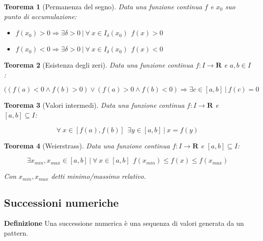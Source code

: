 \documentclass{article}
\newtheorem{theorem}{Teorema}
\begin{document}
\begin{theorem}[Permanenza del segno]
    Data una funzione continua $f$ e $x_0$ suo punto di accumulazione:
    \begin{itemize}
        \item $f(x_0)>0\Rightarrow \exists\delta>0\ |\ \forall\ x\in I_\delta(x_0)\ \ f(x)>0$
        \item $f(x_0)<0\Rightarrow \exists\delta>0\ |\ \forall\ x\in I_\delta(x_0)\ \ f(x)<0$\newline
    \end{itemize}
\end{theorem}

\begin{theorem}[Esistenza degli zeri]
    Data una funzione continua $f:I\rightarrow\mathbf{R}$ e $a,b\in I$:

$$((f(a)<0\wedge f(b)>0)\vee(f(a)>0\wedge f(b)<0)\Rightarrow\exists c\in[a,b]\ |\ f(c)=0$$\newline
    
\end{theorem}

\begin{theorem}[Valori intermedi]
    Data una funzione continua $f:I\rightarrow\mathbf{R}$ e $[a,b]\subseteq I$:

$$\forall\ x\in[f(a),f(b)]\ \ \exists y\in [a,b]\ |\ x=f(y)$$\newline
    
\end{theorem}

\begin{theorem}[Weierstrass]
    Data una funzione continua $f:I\rightarrow\mathbf{R}$ e $[a,b]\subseteq I$:

$$\exists x_{min},x_{max}\in[a,b]\ |\ \forall\ x\in[a,b]\ \ f(x_{min})\leq f(x)\leq f(x_{max})$$

\noindent Con $x_{min},x_{max}$ detti minimo/massimo relativo.\newline
    
\end{theorem}

\subsection{Successioni numeriche}

\textbf{Definizione} Una successione numerica è una sequenza di valori generata da un pattern.\newline
\end{document}
